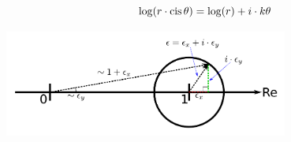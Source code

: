 \documentclass{article}
\newcommand{\cis}{\textnormal{cis}\,}
\begin{document}
\[\log(r \cdot \cis\theta) = \log(r) + i \cdot k\theta\]


\begin{center}
\includegraphics[width = 0.7\textwidth]{complex_number_natural_logarithm}
\end{center}
\end{document}
